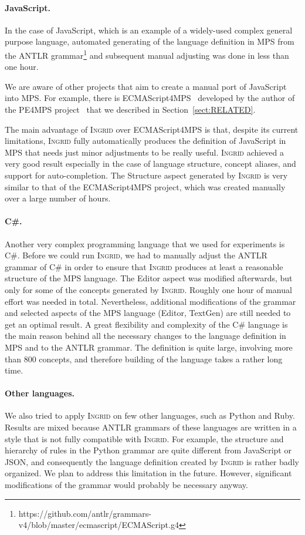 \paragraph{JavaScript.}
In the case of JavaScript, which is an example of a widely-used complex general purpose language, automated generating of the language definition in MPS from the ANTLR grammar\footnote{https://github.com/antlr/grammars-v4/blob/master/ecmascript/ECMAScript.g4} and subsequent manual adjusting was done in less than one hour.

We are aware of other projects that aim to create a manual port of JavaScript into MPS.
For example, there is ECMAScript4MPS~\cite{ref:ECMA4MPS} developed by the author of the PE4MPS project~\cite{ref:PE4MPS} that we described in Section~\ref{sect:RELATED}.

The main advantage of \textsc{Ingrid} over ECMAScript4MPS is that, despite its current limitations, \textsc{Ingrid} fully automatically produces the definition of JavaScript in MPS that needs just minor adjustments to be really useful.
\textsc{Ingrid} achieved a very good result especially in the case of language structure, concept aliases, and support for auto-completion.
The Structure aspect generated by \textsc{Ingrid} is very similar to that of the ECMAScript4MPS project, which was created manually over a large number of hours.

\paragraph{C\#.}
Another very complex programming language that we used for experiments is C\#.
Before we could run \textsc{Ingrid}, we had to manually adjust the ANTLR grammar of C\# in order to ensure that \textsc{Ingrid} produces at least a reasonable structure of the MPS language.
The Editor aspect was modified afterwards, but only for some of the concepts generated by \textsc{Ingrid}. 
Roughly one hour of manual effort was needed in total.
Nevertheless, additional modifications of the grammar and selected aspects of the MPS language (Editor, TextGen) are still needed to get an optimal result.
A great flexibility and complexity of the C\# language is the main reason behind all the necessary changes to the language definition in MPS and to the ANTLR grammar.
The definition is quite large, involving more than 800 concepts, and therefore building of the language takes a rather long time.

\paragraph{Other languages.}
We also tried to apply \textsc{Ingrid} on few other languages, such as Python and Ruby.
Results are mixed because ANTLR grammars of these languages are written in a style that is not fully compatible with \textsc{Ingrid}.
For example, the structure and hierarchy of rules in the Python grammar are quite different from JavaScript or JSON, and consequently the language definition created by \textsc{Ingrid} is rather badly organized.
We plan to address this limitation in the future.
However, significant modifications of the grammar would probably be necessary anyway.

